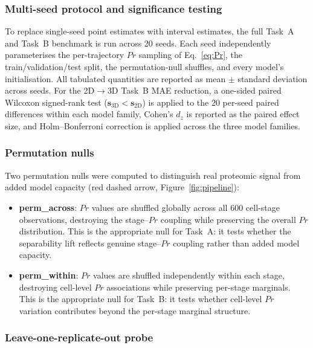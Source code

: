 \documentclass[5p,times,twocolumn]{elsarticle}
\begin{document}
\subsubsection{Multi-seed protocol and significance testing}
\label{sec:multiseed}

To replace single-seed point estimates with interval
estimates, the full Task~A and Task~B benchmark is run across
20 seeds. Each seed independently parameterises the
per-trajectory $Pr$ sampling of Eq.~\eqref{eq:Pr}, the
train/validation/test split, the permutation-null shuffles,
and every model's initialisation. All tabulated quantities
are reported as mean $\pm$ standard deviation across seeds.
For the 2D$\to$3D Task~B MAE reduction, a one-sided paired
Wilcoxon signed-rank test ($\mathbf{s}_{3\text{D}} <
\mathbf{s}_{2\text{D}}$) is applied to the 20 per-seed paired
differences within each model family, Cohen's $d_{z}$ is
reported as the paired effect size, and Holm--Bonferroni
correction is applied across the three model families.

\subsubsection{Permutation nulls}

Two permutation nulls were computed to distinguish real
proteomic signal from added model capacity
(red dashed arrow, Figure~\ref{fig:pipeline}):
%
\begin{itemize}
  \item \textbf{perm\_across}: $Pr$ values are shuffled
    globally across all 600 cell-stage observations,
    destroying the stage--$Pr$ coupling while preserving
    the overall $Pr$ distribution.
    This is the appropriate null for Task~A: it tests whether
    the separability lift reflects genuine stage--$Pr$
    coupling rather than added model capacity.
  \item \textbf{perm\_within}: $Pr$ values are shuffled
    independently within each stage, destroying cell-level
    $Pr$ associations while preserving per-stage marginals.
    This is the appropriate null for Task~B: it tests whether
    cell-level $Pr$ variation contributes beyond the
    per-stage marginal structure.
\end{itemize}

\subsubsection{Leave-one-replicate-out probe}
\label{sec:loro}
\end{document}
